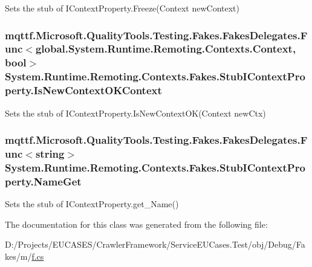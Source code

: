 Sets the stub of I\-Context\-Property.\-Freeze(\-Context new\-Context)

\hypertarget{class_system_1_1_runtime_1_1_remoting_1_1_contexts_1_1_fakes_1_1_stub_i_context_property_a6f7288580ccc240170190b2cb0d035e9}{
\subsubsection[{Is\-New\-Context\-O\-K\-Context}]{\setlength{\rightskip}{0pt plus 5cm}mqttf.\-Microsoft.\-Quality\-Tools.\-Testing.\-Fakes.\-Fakes\-Delegates.\-Func$<$global.\-System.\-Runtime.\-Remoting.\-Contexts.\-Context, bool$>$ System.\-Runtime.\-Remoting.\-Contexts.\-Fakes.\-Stub\-I\-Context\-Property.\-Is\-New\-Context\-O\-K\-Context}}\label{class_system_1_1_runtime_1_1_remoting_1_1_contexts_1_1_fakes_1_1_stub_i_context_property_a6f7288580ccc240170190b2cb0d035e9}


Sets the stub of I\-Context\-Property.\-Is\-New\-Context\-O\-K(\-Context new\-Ctx)

\hypertarget{class_system_1_1_runtime_1_1_remoting_1_1_contexts_1_1_fakes_1_1_stub_i_context_property_ad82baaa3ce61fc5e13cf64004e41b700}{
\subsubsection[{Name\-Get}]{\setlength{\rightskip}{0pt plus 5cm}mqttf.\-Microsoft.\-Quality\-Tools.\-Testing.\-Fakes.\-Fakes\-Delegates.\-Func$<$string$>$ System.\-Runtime.\-Remoting.\-Contexts.\-Fakes.\-Stub\-I\-Context\-Property.\-Name\-Get}}\label{class_system_1_1_runtime_1_1_remoting_1_1_contexts_1_1_fakes_1_1_stub_i_context_property_ad82baaa3ce61fc5e13cf64004e41b700}


Sets the stub of I\-Context\-Property.\-get\-\_\-\-Name()



The documentation for this class was generated from the following file\-:\begin{DoxyCompactItemize}
\item 
D\-:/\-Projects/\-E\-U\-C\-A\-S\-E\-S/\-Crawler\-Framework/\-Service\-E\-U\-Cases.\-Test/obj/\-Debug/\-Fakes/m/\hyperlink{m_2f_8cs}{f.\-cs}\end{DoxyCompactItemize}
